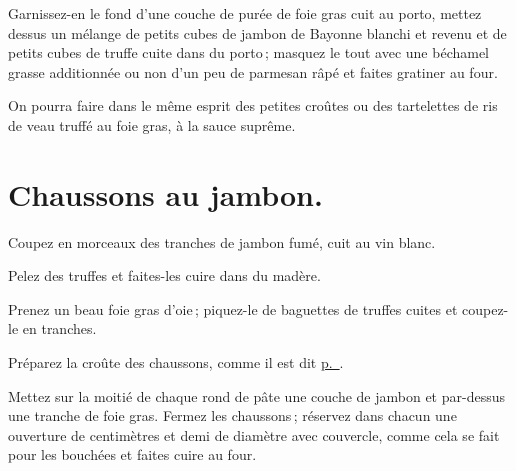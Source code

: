 Garnissez-en le fond d'une couche de purée de foie gras cuit au porto, mettez
dessus un mélange de petits cubes de jambon de Bayonne blanchi et revenu et de
petits cubes de truffe cuite dans du porto ; masquez le tout avec une béchamel
grasse additionnée ou non d'un peu de parmesan râpé et faites gratiner au four.

\sk

On pourra faire dans le même esprit des petites croûtes ou des tartelettes de
ris de veau truffé au foie gras, à la sauce suprême.

\section*{\centering Chaussons au jambon.}
{}

Coupez en morceaux des tranches de jambon fumé, cuit au vin blanc.

Pelez des truffes et faites-les cuire dans du madère.

Prenez un beau foie gras d'oie ; piquez-le de baguettes de truffes cuites et
coupez-le en tranches.

Préparez la croûte des chaussons, comme il est dit \hyperlink{p0289}{p. \pageref{pg0289}}.

Mettez sur la moitié de chaque rond de pâte une couche de jambon et par-dessus
une tranche de foie gras. Fermez les chaussons ; réservez dans chacun une
ouverture de {\mmm} centimètres et demi de diamètre avec couvercle, comme cela se
fait pour les bouchées et faites cuire au four.

